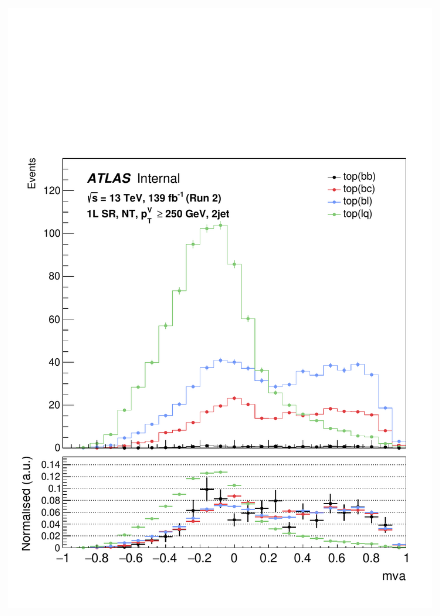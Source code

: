 \begin{figure}[h!]
\center
\includegraphics[scale=0.253]{Images/VH/top/OneLepton_top_1nttag2jet_SR_250ptv_mva.pdf}

\end{figure}
